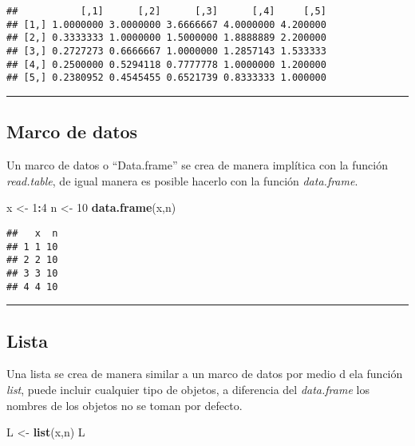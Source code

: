 \documentclass[11pt,]{article}
\newenvironment{Shaded}{\begin{snugshade}}{\end{snugshade}}
\newcommand{\DecValTok}[1]{\textcolor[rgb]{0.00,0.00,0.81}{#1}}
\newcommand{\KeywordTok}[1]{\textcolor[rgb]{0.13,0.29,0.53}{\textbf{#1}}}
\newcommand{\NormalTok}[1]{#1}
\newcommand{\OperatorTok}[1]{\textcolor[rgb]{0.81,0.36,0.00}{\textbf{#1}}}
\newcommand{\StringTok}[1]{\textcolor[rgb]{0.31,0.60,0.02}{#1}}
\begin{document}
\begin{verbatim}
##           [,1]      [,2]      [,3]      [,4]     [,5]
## [1,] 1.0000000 3.0000000 3.6666667 4.0000000 4.200000
## [2,] 0.3333333 1.0000000 1.5000000 1.8888889 2.200000
## [3,] 0.2727273 0.6666667 1.0000000 1.2857143 1.533333
## [4,] 0.2500000 0.5294118 0.7777778 1.0000000 1.200000
## [5,] 0.2380952 0.4545455 0.6521739 0.8333333 1.000000
\end{verbatim}

\begin{center}\rule{0.5\linewidth}{0.5pt}\end{center}

\hypertarget{marco-de-datos}{%
\subsection{Marco de datos}\label{marco-de-datos}}

Un marco de datos o ``Data.frame'' se crea de manera implítica con la
función \emph{read.table}, de igual manera es posible hacerlo con la
función \emph{data.frame}.

\begin{Shaded}
\begin{Highlighting}[]
\NormalTok{x <-}\StringTok{ }\DecValTok{1}\OperatorTok{:}\DecValTok{4}
\NormalTok{n <-}\StringTok{ }\DecValTok{10}
\KeywordTok{data.frame}\NormalTok{(x,n)}
\end{Highlighting}
\end{Shaded}

\begin{verbatim}
##   x  n
## 1 1 10
## 2 2 10
## 3 3 10
## 4 4 10
\end{verbatim}

\begin{center}\rule{0.5\linewidth}{0.5pt}\end{center}

\hypertarget{lista}{%
\subsection{Lista}\label{lista}}

Una lista se crea de manera similar a un marco de datos por medio d ela
función \emph{list}, puede incluir cualquier tipo de objetos, a
diferencia del \emph{data.frame} los nombres de los objetos no se toman
por defecto.

\begin{Shaded}
\begin{Highlighting}[]
\NormalTok{L <-}\StringTok{ }\KeywordTok{list}\NormalTok{(x,n)}
\NormalTok{L}
\end{Highlighting}
\end{Shaded}
\end{document}
